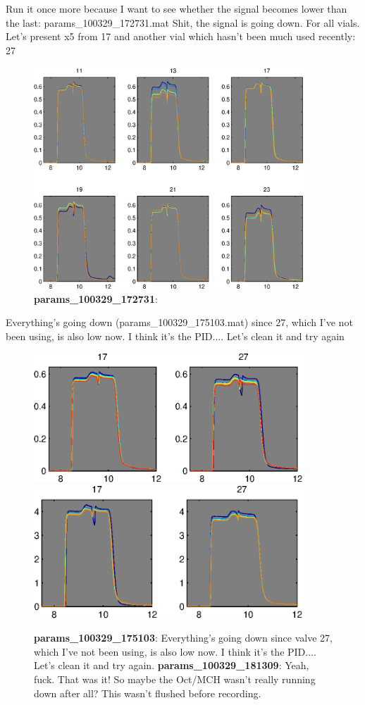 \documentclass[a4paper]{report}
\begin{document}
Run it once more because I want to see whether the signal becomes
lower than the last: params\_100329\_172731.mat
Shit, the signal is going down.  For all vials. 
Let's present x5 from 17 and another vial which hasn't been much used
recently: 27


\begin{figure}[h]
\centering
\includegraphics[width=4in]{params_100329_172731.eps}
\caption{\textbf{params\_100329\_172731}:}
\end{figure}

\clearpage
Everything's going down (params\_100329\_175103.mat) since 27, which
I've not been using, is also low now. I think it's the PID....
Let's clean it and try again

\begin{figure}[h]
\centering
\includegraphics[width=4in]{params_100329_175103.eps}
\includegraphics[width=4in]{params_100329_181309.eps}
\caption{\textbf{params\_100329\_175103}: Everything's going down
  since valve 27, which I've not been using, is also low now. I think
  it's the PID....  Let's clean it and try
  again. \textbf{params\_100329\_181309}:
Yeah, fuck. That was it! So maybe the Oct/MCH wasn't really running
down after all? This wasn't flushed before recording. }
\end{figure}
\end{document}

